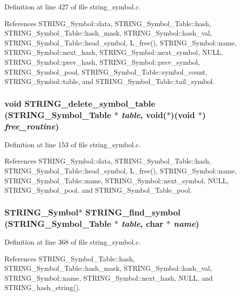 Definition at line 427 of file string\_\-symbol.c.

References STRING\_\-Symbol::data, STRING\_\-Symbol\_\-Table::hash, STRING\_\-Symbol\_\-Table::hash\_\-mask, STRING\_\-Symbol::hash\_\-val, STRING\_\-Symbol\_\-Table::head\_\-symbol, L\_\-free(), STRING\_\-Symbol::name, STRING\_\-Symbol::next\_\-hash, STRING\_\-Symbol::next\_\-symbol, NULL, STRING\_\-Symbol::prev\_\-hash, STRING\_\-Symbol::prev\_\-symbol, STRING\_\-Symbol\_\-pool, STRING\_\-Symbol\_\-Table::symbol\_\-count, STRING\_\-Symbol::table, and STRING\_\-Symbol\_\-Table::tail\_\-symbol.
\subsubsection{\setlength{\rightskip}{0pt plus 5cm}void STRING\_\-delete\_\-symbol\_\-table (\bf{STRING\_\-Symbol\_\-Table} $\ast$ {\em table}, void($\ast$)(void $\ast$) {\em free\_\-routine})}\label{string__symbol_8c_d4fa6d3a295ecc9c21da1cd8d828474e}




Definition at line 153 of file string\_\-symbol.c.

References STRING\_\-Symbol::data, STRING\_\-Symbol\_\-Table::hash, STRING\_\-Symbol\_\-Table::head\_\-symbol, L\_\-free(), STRING\_\-Symbol::name, STRING\_\-Symbol\_\-Table::name, STRING\_\-Symbol::next\_\-symbol, NULL, STRING\_\-Symbol\_\-pool, and STRING\_\-Symbol\_\-Table\_\-pool.
\subsubsection{\setlength{\rightskip}{0pt plus 5cm}\bf{STRING\_\-Symbol}$\ast$ STRING\_\-find\_\-symbol (\bf{STRING\_\-Symbol\_\-Table} $\ast$ {\em table}, char $\ast$ {\em name})}\label{string__symbol_8c_37705fddebdfab067437338d4063abbe}




Definition at line 368 of file string\_\-symbol.c.

References STRING\_\-Symbol\_\-Table::hash, STRING\_\-Symbol\_\-Table::hash\_\-mask, STRING\_\-Symbol::hash\_\-val, STRING\_\-Symbol::name, STRING\_\-Symbol::next\_\-hash, NULL, and STRING\_\-hash\_\-string().
